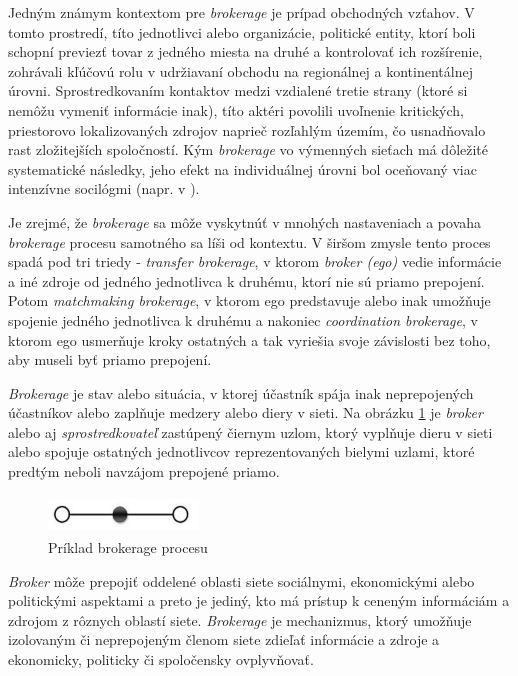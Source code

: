 \documentclass[slovak,master,public,dept460,male,cpdeclaration,oneside]{diploma}
\begin{document}
Jedným známym kontextom pre \textit{brokerage} je prípad obchodných vzťahov. V tomto prostredí, títo jednotlivci alebo organizácie, politické entity, ktorí boli schopní previezť tovar z jedného miesta na druhé a kontrolovať ich rozšírenie, zohrávali kľúčovú rolu v udržiavaní obchodu na regionálnej a kontinentálnej úrovni. Sprostredkovaním kontaktov medzi vzdialené tretie strany (ktoré si nemôžu vymeniť informácie inak), títo aktéri povolili uvoľnenie kritických, priestorovo lokalizovaných zdrojov naprieč rozľahlým územím, čo usnadňovalo rast zložitejších spoločností.  Kým \textit{brokerage} vo výmenných sieťach má dôležité systematické následky, jeho efekt na individuálnej úrovni bol oceňovaný viac intenzívne socilógmi (napr. v \cite{15} \cite{17} \cite{18}). 


Je zrejmé, že \textit{brokerage} sa môže vyskytnúť v mnohých nastaveniach a povaha \textit{brokerage} procesu samotného sa líši od kontextu. V širšom zmysle tento proces spadá pod tri triedy - \textit{transfer brokerage}, v ktorom \textit{broker (ego)} vedie informácie a iné zdroje od jedného jednotlivca k druhému, ktorí nie sú priamo prepojení. Potom \textit{matchmaking brokerage}, v ktorom ego predstavuje alebo inak umožňuje spojenie jedného jednotlivca k druhému a nakoniec \textit{coordination brokerage}, v ktorom ego usmerňuje kroky ostatných a tak vyriešia svoje závislosti bez toho, aby museli byť priamo prepojení.


\textit{Brokerage} je stav alebo situácia, v ktorej účastník spája inak neprepojených účastníkov alebo zaplňuje medzery alebo diery v sieti. \cite{15} Na obrázku \ref{brokerage_example} je \textit{broker} alebo aj \textit{sprostredkovateľ} zastúpený čiernym uzlom, ktorý vyplňuje dieru v sieti alebo spojuje ostatných jednotlivcov reprezentovaných bielymi uzlami, ktoré predtým neboli navzájom prepojené priamo.

\begin{figure}[H]
\centering
\includegraphics[width=4cm, height=1cm]{figures/brokerage_example}
\caption{Príklad brokerage procesu}
\label{brokerage_example}
\end{figure}

\textit{Broker} môže prepojiť oddelené oblasti siete sociálnymi, ekonomickými alebo politickými aspektami a preto je jediný, kto má prístup k ceneným informáciám a zdrojom z rôznych oblastí siete. \textit{Brokerage} je mechanizmus, ktorý umožňuje izolovaným či neprepojeným členom siete zdieľať informácie a zdroje a ekonomicky, politicky či spoločensky ovplyvňovať. \cite{16}
\end{document}
